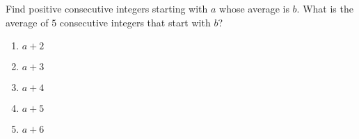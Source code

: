 Find positive consecutive integers starting with $a$ whose average is $b$. What is the average of $5$ consecutive integers that start with $b$?
\begin{enumerate}
\item $a+2$
\item $a+3$
\item $a+4$
\item $a+5$
\item $a+6$
\end{enumerate}